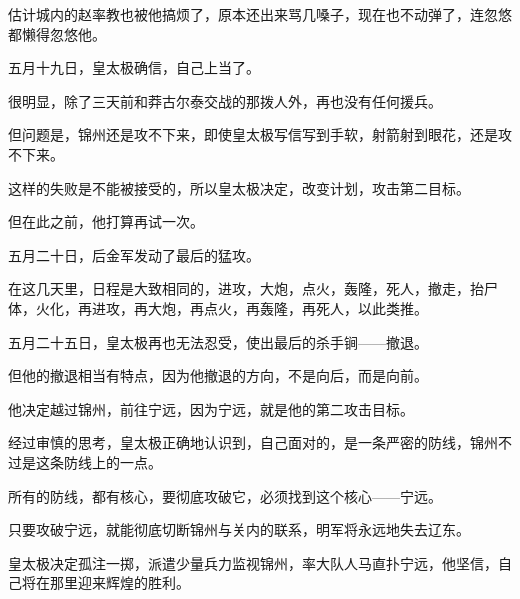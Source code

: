 \begin{multicols}{\theparacolNo}
估计城内的赵率教也被他搞烦了，原本还出来骂几嗓子，现在也不动弹了，连忽悠都懒得忽悠他。

五月十九日，皇太极确信，自己上当了。

很明显，除了三天前和莽古尔泰交战的那拨人外，再也没有任何援兵。

但问题是，锦州还是攻不下来，即使皇太极写信写到手软，射箭射到眼花，还是攻不下来。

这样的失败是不能被接受的，所以皇太极决定，改变计划，攻击第二目标。

但在此之前，他打算再试一次。

五月二十日，后金军发动了最后的猛攻。

在这几天里，日程是大致相同的，进攻，大炮，点火，轰隆，死人，撤走，抬尸体，火化，再进攻，再大炮，再点火，再轰隆，再死人，以此类推。

五月二十五日，皇太极再也无法忍受，使出最后的杀手锏——撤退。

但他的撤退相当有特点，因为他撤退的方向，不是向后，而是向前。

他决定越过锦州，前往宁远，因为宁远，就是他的第二攻击目标。

经过审慎的思考，皇太极正确地认识到，自己面对的，是一条严密的防线，锦州不过是这条防线上的一点。

所有的防线，都有核心，要彻底攻破它，必须找到这个核心——宁远。

只要攻破宁远，就能彻底切断锦州与关内的联系，明军将永远地失去辽东。

皇太极决定孤注一掷，派遣少量兵力监视锦州，率大队人马直扑宁远，他坚信，自己将在那里迎来辉煌的胜利。
\ifnum{}
	\end{multicols}
\fi
\newpage
